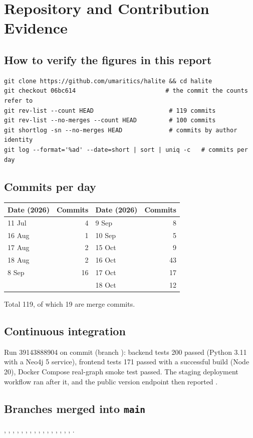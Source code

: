 \chapter{Repository and Contribution Evidence}\label{app:repo}
\section*{How to verify the figures in this report}
\begin{lstlisting}
git clone https://github.com/umaritics/halite && cd halite
git checkout 06bc614                         # the commit the counts refer to
git rev-list --count HEAD                     # 119 commits
git rev-list --no-merges --count HEAD         # 100 commits
git shortlog -sn --no-merges HEAD             # commits by author identity
git log --format='%ad' --date=short | sort | uniq -c   # commits per day
\end{lstlisting}

\section*{Commits per day}
\begin{longtable}{lrlr}
\toprule \textbf{Date (2026)} & \textbf{Commits} & \textbf{Date (2026)} & \textbf{Commits} \\ \midrule
11 Jul & 4 & 9 Sep & 8 \\
16 Aug & 1 & 10 Sep & 5 \\
17 Aug & 2 & 15 Oct & 9 \\
18 Aug & 2 & 16 Oct & 43 \\
8 Sep & 16 & 17 Oct & 17 \\
 & & 18 Oct & 12 \\
\bottomrule
\end{longtable}
Total 119, of which 19 are merge commits.

\section*{Continuous integration}
Run 39143888904 on commit  (branch ): backend tests 200 passed (Python 3.11 with a Neo4j 5 service), frontend tests 171 passed with a successful build (Node 20), Docker Compose real-graph smoke test passed. The staging deployment workflow ran after it, and the public version endpoint then reported .

\section*{Branches merged into \texttt{main}}
, , , , , , , , , , , , , , , , .


